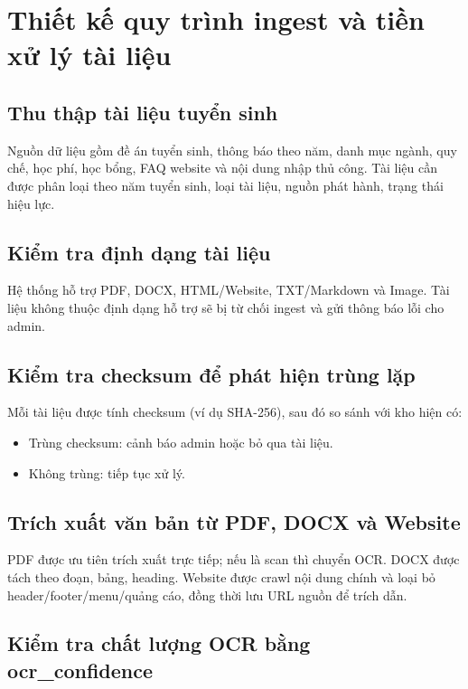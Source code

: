﻿\section{Thiết kế quy trình ingest và tiền xử lý tài liệu}

\subsection{Thu thập tài liệu tuyển sinh}

Nguồn dữ liệu gồm đề án tuyển sinh, thông báo theo năm, danh mục ngành, quy chế, học phí, học bổng, FAQ website và nội dung nhập thủ công. Tài liệu cần được phân loại theo năm tuyển sinh, loại tài liệu, nguồn phát hành, trạng thái hiệu lực.

\subsection{Kiểm tra định dạng tài liệu}

Hệ thống hỗ trợ PDF, DOCX, HTML/Website, TXT/Markdown và Image. Tài liệu không thuộc định dạng hỗ trợ sẽ bị từ chối ingest và gửi thông báo lỗi cho admin.

\subsection{Kiểm tra checksum để phát hiện trùng lặp}

Mỗi tài liệu được tính checksum (ví dụ SHA-256), sau đó so sánh với kho hiện có:
\begin{itemize}
    \item Trùng checksum: cảnh báo admin hoặc bỏ qua tài liệu.
    \item Không trùng: tiếp tục xử lý.
\end{itemize}

\subsection{Trích xuất văn bản từ PDF, DOCX và Website}

PDF được ưu tiên trích xuất trực tiếp; nếu là scan thì chuyển OCR. DOCX được tách theo đoạn, bảng, heading. Website được crawl nội dung chính và loại bỏ header/footer/menu/quảng cáo, đồng thời lưu URL nguồn để trích dẫn.

\subsection{Kiểm tra chất lượng OCR bằng ocr\_confidence}

